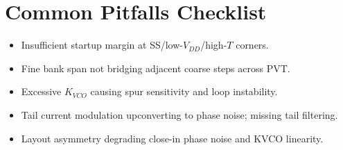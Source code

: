 \section{Common Pitfalls Checklist}
\begin{itemize}
  \item Insufficient startup margin at SS/low-$V_{DD}$/high-$T$ corners.
  \item Fine bank span not bridging adjacent coarse steps across PVT.
  \item Excessive $K_{VCO}$ causing spur sensitivity and loop instability.
  \item Tail current modulation upconverting to phase noise; missing tail filtering.
  \item Layout asymmetry degrading close-in phase noise and KVCO linearity.
\end{itemize}


